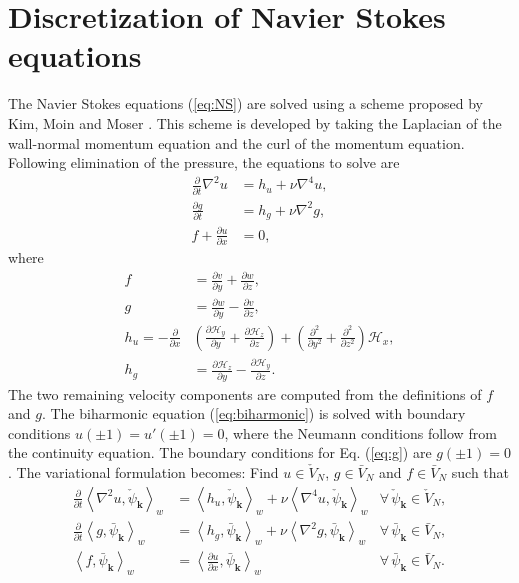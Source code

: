 \documentclass[preprint]{elsarticle}
\newcommand{\N}[1]{\check{#1}}
\newcommand{\D}[1]{\bar{#1}}
\begin{document}
\section{Discretization of Navier Stokes equations}
\label{sec:discretizationNS}
The Navier Stokes equations (\ref{eq:NS}) are solved using a scheme 
proposed by Kim, Moin and Moser \cite{Kim87}. This scheme is developed by taking the 
Laplacian of the wall-normal momentum equation and the curl of the momentum 
equation. Following elimination of the pressure, the equations to solve are 
\begin{align}
\frac{\partial}{\partial t} \nabla^2 u &= h_u + \nu \nabla^4 u, 
\label{eq:biharmonic} \\
\frac{\partial g}{\partial t} &= h_g + \nu \nabla^2 g, \label{eq:g} \\
f + \frac{\partial u}{\partial x} &= 0, \label{eq:f}
\end{align}
where
\begin{align}
f &= \frac{\partial v}{\partial y} + \frac{\partial w}{\partial z}, \\
g &= \frac{\partial w}{\partial y} - \frac{\partial v}{\partial z}, \\
h_u = -\frac{\partial}{\partial x} &\left( \frac{\partial 
\mathcal{H}_y}{\partial y} + \frac{\partial \mathcal{H}_z}{\partial z} \right) 
+ \left(\frac{\partial^2}{\partial y^2} + \frac{\partial^2}{\partial z^2} 
\right) \mathcal{H}_x ,
\\
h_g &= \frac{\partial \mathcal{H}_z}{\partial y} - \frac{\partial 
\mathcal{H}_y}{\partial z}.
\end{align}
The two remaining velocity components are computed from the definitions of $f$ 
and $g$. The biharmonic equation (\ref{eq:biharmonic}) is solved with boundary 
conditions $u(\pm 1) = u'(\pm 1) = 0$, where the Neumann conditions follow 
from the continuity equation. The boundary conditions for Eq. (\ref{eq:g}) are 
$g(\pm 1) = 0$. The variational formulation becomes: Find ${u} \in 
\N{V}_N$, ${g} \in \D{V}_N$ and ${f} \in \D{V}_N$ such that
\begin{align}
	\frac{\partial }{\partial t} \left< \nabla^2 u, \N{\psi}_{\bm{k}}\right>_w &= 
	\left<h_u, \N{\psi}_{\bm{k}} \right>_w + \nu \left<\nabla^4u, \N{\psi}_{\bm{k}}\right>_w 
	&\forall \,\N{\psi}_{\bm{k}} \in \N{V}_N, \label{eq:u1} \\
	\frac{\partial}{\partial t}\left<g, \D{\psi}_{\bm{k}}\right>_w &= \left<h_g, 
	\D{\psi}_{\bm{k}}\right>_w + \nu 
	\left<\nabla^2 g, \D{\psi}_{\bm{k}}\right>_w &\forall \, \D{\psi}_{\bm{k}} \in \D{V}_N ,
	\label{eq:g1} \\
	\left<f, \D{\psi}_{\bm{k}}\right>_w &= \left<\frac{\partial u}{\partial x}, 
	\D{\psi}_{\bm{k}}\right>_w &\forall \, \D{\psi}_{\bm{k}} \in \D{V}_N. \label{eq:f1}
\end{align}
\end{document}
